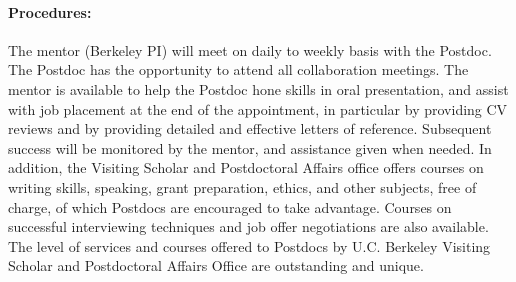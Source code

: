 \documentclass[11pt]{article}
\begin{document}
\paragraph{Procedures: } The mentor (Berkeley PI) will meet on daily to weekly basis with the Postdoc. The Postdoc has the opportunity to attend all collaboration meetings.
The mentor is available to help the Postdoc hone skills in oral presentation, and assist with job placement at the end of the appointment, in particular by providing CV reviews and by providing detailed and effective letters of reference. Subsequent success will be monitored by the mentor, and assistance given when needed.
In addition, the Visiting Scholar and Postdoctoral Affairs office offers courses on writing skills, speaking, grant preparation, ethics, and other subjects, free of charge, of which Postdocs are encouraged to take advantage. Courses on successful interviewing techniques and job offer negotiations are also available. The level of services and courses offered to Postdocs by U.C. Berkeley Visiting Scholar and Postdoctoral Affairs Office are outstanding and unique.
\end{document}
